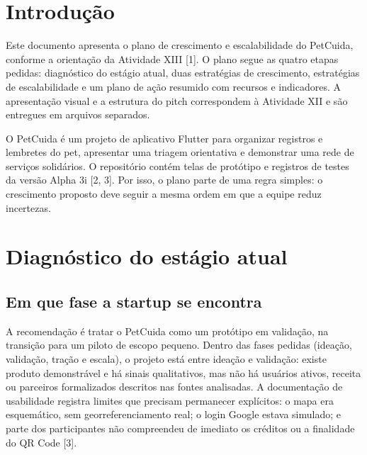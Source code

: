 \documentclass[12pt,a4paper]{article}
\begin{document}
\tableofcontents
\clearpage
{}

\section{Introdução}

Este documento apresenta o plano de crescimento e escalabilidade do PetCuida, conforme a orientação da Atividade XIII [1]. O plano segue as quatro etapas pedidas: diagnóstico do estágio atual, duas estratégias de crescimento, estratégias de escalabilidade e um plano de ação resumido com recursos e indicadores. A apresentação visual e a estrutura do pitch correspondem à Atividade XII e são entregues em arquivos separados.

O PetCuida é um projeto de aplicativo Flutter para organizar registros e lembretes do pet, apresentar uma triagem orientativa e demonstrar uma rede de serviços solidários. O repositório contém telas de protótipo e registros de testes da versão Alpha 3i [2, 3]. Por isso, o plano parte de uma regra simples: o crescimento proposto deve seguir a mesma ordem em que a equipe reduz incertezas.

\section{Diagnóstico do estágio atual}

\subsection{Em que fase a startup se encontra}

A recomendação é tratar o PetCuida como um protótipo em validação, na transição para um piloto de escopo pequeno. Dentro das fases pedidas (ideação, validação, tração e escala), o projeto está entre ideação e validação: existe produto demonstrável e há sinais qualitativos, mas não há usuários ativos, receita ou parceiros formalizados descritos nas fontes analisadas. A documentação de usabilidade registra limites que precisam permanecer explícitos: o mapa era esquemático, sem georreferenciamento real; o login Google estava simulado; e parte dos participantes não compreendeu de imediato os créditos ou a finalidade do QR Code [3].
\end{document}
